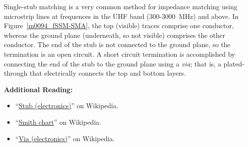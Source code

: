 Single-stub matching is a very common method for impedance matching using microstrip lines at frequences in the UHF band (300-3000~MHz) and above.  In Figure~\ref{m0094_fSSM-SMA}, the top (visible) traces comprise one conductor, whereas the ground plane (underneath, so not visible) comprises the other conductor.  The end of the stub is not connected to the ground plane, so the termination is an open circuit.  A short circuit termination is accomplished by connecting the end of the stub to the ground plane using a \emph{via}; that is, a plated-through that electrically connects the top and bottom layers.


{\bf Additional Reading:}
\begin{itemize}
\item ``\href{https://en.wikipedia.org/wiki/Stub_(electronics)}{Stub (electronics)}'' on Wikipedia.
\item ``\href{https://en.wikipedia.org/wiki/Smith_chart}{\small Smith chart}'' on Wikipedia.
\item ``\href{https://en.wikipedia.org/wiki/Via_(electronics)}{Via (electronics)}'' on Wikipedia.
\end{itemize}

